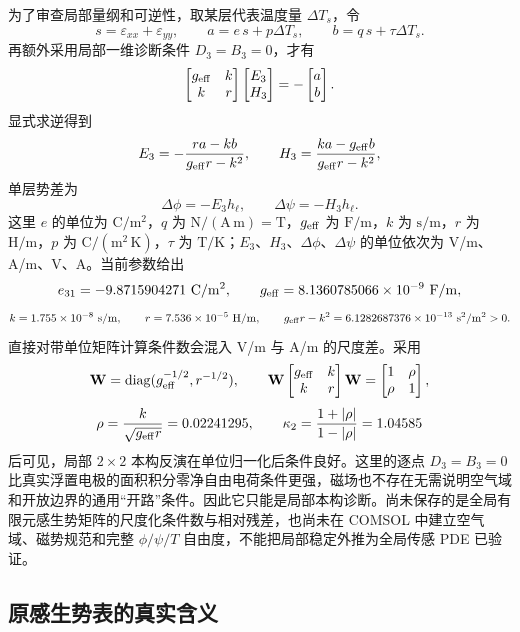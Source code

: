 \documentclass[UTF8,fontset=windows,11pt,a4paper]{ctexart}
\begin{document}
为了审查局部量纲和可逆性，取某层代表温度量 $\Delta T_s$，令
\[
s=\varepsilon_{xx}+\varepsilon_{yy},\qquad
a=e\,s+p\Delta T_s,\qquad b=q\,s+\tau\Delta T_s.
\]
再额外采用局部一维诊断条件 $D_3=B_3=0$，才有
\[
\begin{bmatrix}g_{\rm eff}&k\\k&r\end{bmatrix}
\begin{bmatrix}E_3\\H_3\end{bmatrix}
=-\begin{bmatrix}a\\b\end{bmatrix}.
\]
显式求逆得到
\[
E_3=-\frac{ra-kb}{g_{\rm eff}r-k^2},\qquad
H_3=\frac{ka-g_{\rm eff}b}{g_{\rm eff}r-k^2},
\]
单层势差为
\[
\Delta\phi=-E_3h_\ell,\qquad \Delta\psi=-H_3h_\ell.
\]
这里 $e$ 的单位为 $\mathrm{C/m^2}$，$q$ 为 $\mathrm{N/(A\,m)}=\mathrm T$，$g_{\rm eff}$ 为 $\mathrm{F/m}$，$k$ 为 $\mathrm{s/m}$，$r$ 为 $\mathrm{H/m}$，$p$ 为 $\mathrm{C/(m^2\,K)}$，$\tau$ 为 $\mathrm{T/K}$；$E_3$、$H_3$、$\Delta\phi$、$\Delta\psi$ 的单位依次为 V/m、A/m、V、A。当前参数给出
\[
e_{31}=-9.8715904271\ {\rm C/m^2},\qquad
g_{\rm eff}=8.1360785066\times10^{-9}\ {\rm F/m},
\]
\[
k=1.755\times10^{-8}\ {\rm s/m},\qquad
r=7.536\times10^{-5}\ {\rm H/m},\qquad
g_{\rm eff}r-k^2=6.1282687376\times10^{-13}\ {\rm s^2/m^2}>0.
\]
直接对带单位矩阵计算条件数会混入 V/m 与 A/m 的尺度差。采用
\[
\mathbf W=\operatorname{diag}(g_{\rm eff}^{-1/2},r^{-1/2}),\qquad
\mathbf W
\begin{bmatrix}g_{\rm eff}&k\\k&r\end{bmatrix}
\mathbf W=
\begin{bmatrix}1&\rho\\\rho&1\end{bmatrix},
\]
\[
\rho=\frac{k}{\sqrt{g_{\rm eff}r}}=0.02241295,\qquad
\kappa_2=\frac{1+|\rho|}{1-|\rho|}=1.04585
\]
后可见，局部 $2\times2$ 本构反演在单位归一化后条件良好。这里的逐点 $D_3=B_3=0$ 比真实浮置电极的面积积分零净自由电荷条件更强，磁场也不存在无需说明空气域和开放边界的通用“开路”条件。因此它只能是局部本构诊断。尚未保存的是全局有限元感生势矩阵的尺度化条件数与相对残差，也尚未在 COMSOL 中建立空气域、磁势规范和完整 $\phi/\psi/T$ 自由度，不能把局部稳定外推为全局传感 PDE 已验证。

\subsection{原感生势表的真实含义}
\end{document}
